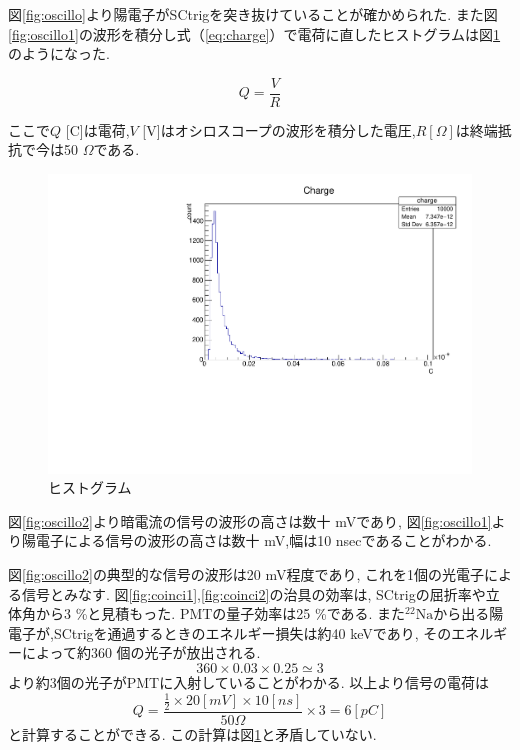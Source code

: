 図\ref{fig:oscillo}より陽電子がSCtrigを突き抜けていることが確かめられた.
また図\ref{fig:oscillo1}の波形を積分し式（\ref{eq:charge}）で電荷に直したヒストグラムは図\ref{fig:charge}のようになった.

\begin{equation}
Q = \frac{V}{R}
\label{eq:charge}
\end{equation}

ここで$Q$ [C]は電荷,$V$ [V]はオシロスコープの波形を積分した電圧,$R [\Omega]$は終端抵抗で今は50 $\Omega$である.

\begin{figure}[htbp]
\centering
\includegraphics[keepaspectratio,angle=270,scale=0.7]{fig/ybm/charge.pdf}
\caption{ヒストグラム}
\label{fig:charge}
\end{figure}


図\ref{fig:oscillo2}より暗電流の信号の波形の高さは数十 mVであり,
図\ref{fig:oscillo1}より陽電子による信号の波形の高さは数十 mV,幅は10 nsecであることがわかる.

図\ref{fig:oscillo2}の典型的な信号の波形は20 mV程度であり,
これを1個の光電子による信号とみなす.
図\ref{fig:coinci1},\ref{fig:coinci2}の治具の効率は,
SCtrigの屈折率や立体角から3 \%と見積もった.
PMTの量子効率は25 \%である.
また$\mathrm{^{22}Na}$から出る陽電子が,SCtrigを通過するときのエネルギー損失は約40 keVであり,
そのエネルギーによって約360 個の光子が放出される.
\begin{equation}
360 \times 0.03 \times 0.25 \simeq 3
\label{eq:pe}
\end{equation}
より約3個の光子がPMTに入射していることがわかる.
以上より信号の電荷は
\begin{equation}
	Q = \frac{\frac{1}{2} \times 20 [\si{mV}] \times 10[\si{ns}]}{50 \Omega} \times 3 = 6 [\si{pC}]
\label{eq:charge1}
\end{equation}
と計算することができる.
この計算は図\ref{fig:charge}と矛盾していない.

